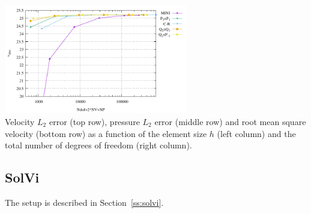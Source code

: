 \begin{center}
\includegraphics[width=8cm]{python_codes/fieldstone_112/results/exp4_rand/vrms_ndof.pdf}\\
{\captionfont Velocity $L_2$ error (top row), pressure $L_2$ error (middle row) and root
mean square velocity (bottom row) as a function of the element size $h$ (left column) 
and the total number of degrees of freedom (right column).}
\end{center}





\newpage
\subsection*{SolVi}

The setup is described in Section~\ref{ss:solvi}. 

